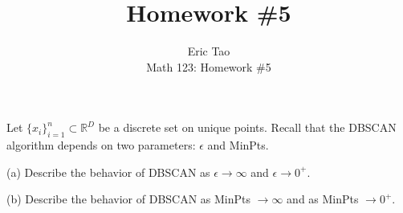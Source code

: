 \documentclass[10pt]{article}
\newenvironment{problem}[2][]{\begin{trivlist}
\item[\hskip \labelsep {\bfseries #1}\hskip \labelsep {\bfseries #2.}]}{\end{trivlist}}
\begin{document}
 
\title{Homework \#5}
\author{Eric Tao\\
Math 123: Homework \#5}
\maketitle

\begin{problem}{Question 1}

Let $\{ x_i \}_{i=1}^n \subset \mathbb{R}^D$ be a discrete set on unique points. Recall that the DBSCAN algorithm depends on two parameters: $\epsilon$ and MinPts.

(a) Describe the behavior of DBSCAN as $\epsilon \to \infty$ and $\epsilon \to 0^+$.

(b) Describe the behavior of DBSCAN as MinPts $\to \infty$ and as MinPts $\to 0^+$.

\end{problem}
\end{document}
